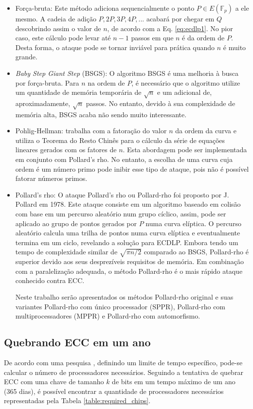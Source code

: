 \begin{itemize}
\item Força-bruta: Este método adiciona sequencialmente o ponto $P \in E(\mathbb{F}_p)$ a ele mesmo. A cadeia de adição $P, 2P, 3P, 4P, ...$ acabará por chegar em \(Q\) descobrindo assim o valor de \(n\), de acordo com a Eq. \ref{eq:ecdlp1}. No pior caso, este cálculo pode levar até $n - 1$ passos em que \(n\) é da ordem de \(P\). Desta forma, o ataque pode se tornar inviável para prática quando \(n\) é muito grande.
\item \textit{Baby Step Giant Step} (BSGS): O algoritmo BSGS é uma melhoria à busca por força-bruta. Para \(n\) na ordem de \(P\), é necessário que o algoritmo utilize um quantidade de memória temporária de $\sqrt{n}$ e um adicional de, aproximadamente, $\sqrt{n}$ passos. No entanto, devido à sua complexidade de memória alta, BSGS acaba não sendo muito interessante.
\item Pohlig-Hellman: trabalha com a fatoração do valor \(n\) da ordem da curva e utiliza o Teorema do Resto Chinês para o cálculo da série de equações lineares gerados com os fatores de \(n\). Esta abordagem pode ser implementada em conjunto com Pollard's rho. No entanto, a escolha de uma curva cuja ordem é um número primo pode inibir esse tipo de ataque, pois não é possível fatorar números primos.
\item Pollard's rho: O ataque Pollard's rho ou Pollard-rho foi proposto por J. Pollard em 1978. Este ataque consiste em um algoritmo baseado em colisão com base em um percurso aleatório num grupo cíclico, assim, pode ser aplicado ao grupo de pontos gerados por \(P\) numa curva elíptica. O percurso aleatório calcula uma trilha de pontos numa curva elíptica e eventualmente termina em um ciclo, revelando a solução para ECDLP. \cite{Pollard:1978} Embora tendo um tempo de complexidade similar de $\sqrt{\pi n/2}$ comparado ao BSGS, Pollard-rho é superior devido aos seus desprezíveis requisitos de memória. Em combinação com a paralelização adequada, o método Pollard-rho é o mais rápido ataque conhecido contra ECC. \cite{Pelzl:2006}

Neste trabalho serão apresentados os métodos Pollard-rho original e suas variantes Pollard-rho com único processador (SPPR), Pollard-rho com multiprocessadores (MPPR) e Pollard-rho com automorfismo.
\end{itemize}

%
%
\subsection{Quebrando ECC em um ano}
De acordo com uma pesquisa \cite{Pelzl:2006}, definindo um limite de tempo específico, pode-se calcular o número de processadores necessários. Seguindo a tentativa de quebrar ECC com uma chave de tamanho \(k\) de bits em um tempo máximo de um ano (365 dias), é possível encontrar a quantidade de processadores necessários representadas pela Tabela \ref{table:required_chips}.

